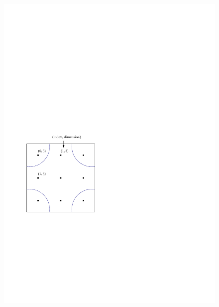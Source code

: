 \documentclass[a4paper,11pt]{article}
\begin{document}
\begin{figure}[h!]
\centerline{\includegraphics[scale=1]{fig/insert_dummy.pdf}}
\caption{\label{}}
\end{figure}
\end{document}
